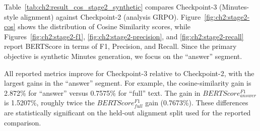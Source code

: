 Table~\ref{tab:ch2:result_cos_stage2_synthetic} compares Checkpoint-3 (Minutes-style alignment) against Checkpoint-2 (analysis GRPO). Figure~\ref{fig:ch2:stage2-cos} shows the distribution of Cosine Similarity scores, while Figures~\ref{fig:ch2:stage2-f1}, \ref{fig:ch2:stage2-precision}, and \ref{fig:ch2:stage2-recall} report BERTScore in terms of F1, Precision, and Recall. Since the primary objective is synthetic Minutes generation, we focus on the ``answer'' segment.

All reported metrics improve for Checkpoint-3 relative to Checkpoint-2, with the largest gains in the ``answer'' segment. For example, the cosine-similarity gain is 2.872\% for ``answer'' versus 0.7575\% for ``full'' text. The gain in $BERTScore_{answer}^{F1}$ is 1.5207\%, roughly twice the $BERTScore_{full}^{F1}$ gain (0.7673\%). These differences are statistically significant on the held-out alignment split used for the reported comparison.



